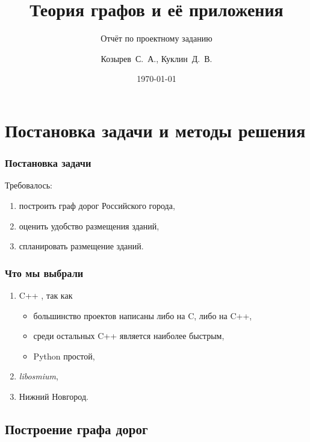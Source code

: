 \documentclass{beamer}
\begin{document}
\title[Теория графов] {Теория графов и её приложения}
\subtitle{Отчёт по проектному заданию}
\author[Козырев С., Куклин Д.] {Козырев~С.~А., Куклин~Д.~В.}
\date[\today]{\today}

\frame{\titlepage}

\section{Постановка задачи и методы решения}

\begin{frame}
\frametitle{Постановка задачи}
Требовалось:
\begin{enumerate}
\pause
\item построить граф дорог Российского города,
\pause
\item оценить удобство размещения зданий,
\pause
\item спланировать размещение зданий.
\end{enumerate}
\end{frame}

\begin{frame}
\frametitle{Что мы выбрали}
\begin{enumerate}
\item C++ \pause, так как
	\begin{itemize}
	\item большинство проектов написаны либо на C, либо на C++,
	\pause	
	\item среди остальных C++ является наиболее быстрым,
	\pause
	\item Python простой,
	\end{itemize}
\pause
\item \textit{libosmium},
\pause
\item Нижний Новгород.
\end{enumerate}
\end{frame}

\subsection{Построение графа дорог}
\end{document}
